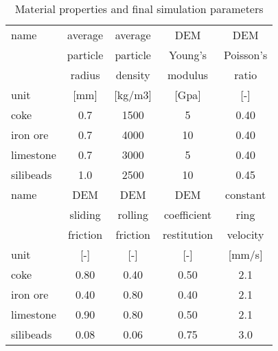 \begin{table}[!htb]
  \centering
  \caption{Material properties and final simulation parameters}
    \begin{tabular}{|lcccc|}
	\hline
    name  & average & average & DEM   & DEM \\
          & particle & particle & Young's & Poisson's \\
          & radius & density & modulus & ratio \\
    unit  & [mm]  & [kg/m3] & [Gpa] & [-] \\
	\hline
    coke  & 0.7   & 1500  & 5     & 0.40 \\
    iron ore & 0.7   & 4000  & 10    & 0.40 \\
    limestone & 0.7   & 3000  & 5     & 0.40 \\
    silibeads & 1.0 & 2500 & 10 & 0.45 \\
 	\hline
    name  & DEM   & DEM   & DEM   & constant \\
          & sliding & rolling & coefficient & ring \\
          & friction & friction & restitution & velocity \\
    unit  & [-]   & [-]   & [-]   & [mm/s] \\
	\hline
    coke  & 0.80  & 0.40  & 0.50   & 2.1 \\
    iron ore & 0.40  & 0.80  & 0.40   & 2.1 \\
    limestone & 0.90  & 0.80  & 0.50   & 2.1 \\
    silibeads & 0.08  & 0.06  & 0.75  & 3.0 \\
	\hline
    \end{tabular}%
  \label{tab:tableprop}%
\end{table}%
